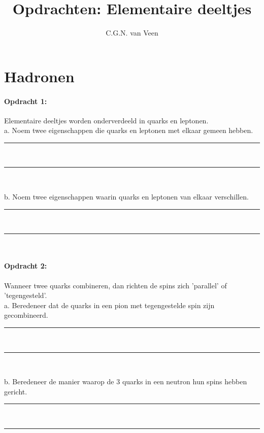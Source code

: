 
\usepackage{hepnames}
\usepackage{mhchem}

\title{Opdrachten: Elementaire deeltjes}
\author{C.G.N. van Veen}



\maketitle

\section{Hadronen}

\paragraph{Opdracht 1:}
Elementaire deeltjes worden onderverdeeld in quarks en leptonen. \\ 
a. Noem twee eigenschappen die quarks en leptonen met elkaar gemeen hebben.
\begin{center}
    \rule{\textwidth}{0.3mm}\\
    \rule{\textwidth}{0.3mm}\\
\end{center}
b. Noem twee eigenschappen waarin quarks en leptonen van elkaar verschillen.
\begin{center}
    \rule{\textwidth}{0.3mm}\\
    \rule{\textwidth}{0.3mm}\\
\end{center}
\bigskip{}
\paragraph{Opdracht 2:}
Wanneer twee quarks combineren, dan richten de spins zich 'parallel' 
of 'tegengesteld'.\\
a. Beredeneer dat de quarks in een pion met tegengestelde spin zijn gecombineerd.
\begin{center}
    \rule{\textwidth}{0.3mm}\\
    \rule{\textwidth}{0.3mm}\\
\end{center}
b. Beredeneer de manier waarop de 3 quarks in een neutron hun spins hebben gericht.
\begin{center}
    \rule{\textwidth}{0.3mm}\\
    \rule{\textwidth}{0.3mm}\\
\end{center}
